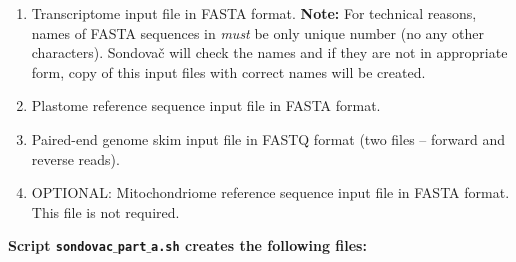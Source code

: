 \documentclass[a4paper, 11pt, twoside]{article}
\begin{document}
\begin{enumerate}
  \item Transcriptome input file in FASTA format. \textbf{Note:} For technical reasons, names of FASTA sequences in \textit{must} be only unique number (no any other characters). Sondovač will check the names and if they are not in appropriate form, copy of this input files with correct names will be created.
  \item Plastome reference sequence input file in FASTA format.
  \item Paired-end genome skim input file in FASTQ format (two files -- forward and reverse reads).
  \item OPTIONAL: Mitochondriome reference sequence input file in FASTA format. This file is not required.
\end{enumerate}

\textbf{Script \texttt{sondovac$\_$part$\_$a.sh} creates the following files:}
\end{document}

